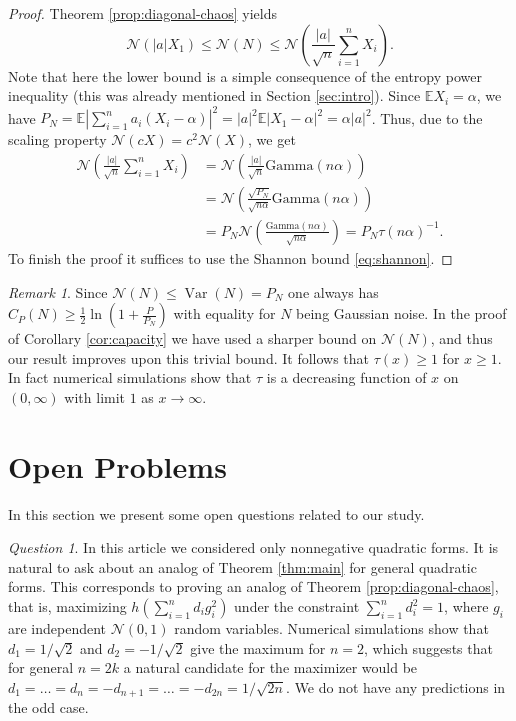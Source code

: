 \documentclass[11pt]{amsart}
\newcommand{\mc}[1]{\mathcal{{#1}}}
\newcommand{\1}{\mathbf{1}}
\newcommand{\E}{\mathbb{E}}
\DeclareMathOperator{\var}{Var}
\theoremstyle{definition}
\theoremstyle{definition}
\theoremstyle{remark}
\newtheorem{rem}{Remark}
\newtheorem{question}{Question}
\begin{document}
\begin{proof}
Theorem \ref{prop:diagonal-chaos} yields
\[
\mc{N}\left(|a| X_1 \right) \leq \mc{N}(N) \leq \mc{N}\left(\frac{|a|}{\sqrt{n}} \sum_{i=1}^n X_i \right).
\]
Note that here the lower bound is a simple consequence of the entropy power inequality (this was already mentioned in Section \ref{sec:intro}). Since $\E X_i=\alpha$, we have $P_N = \E|\sum_{i=1}^n a_i(X_i-\alpha)|^2=|a|^2 \E|X_1-\alpha|^2=\alpha |a|^2$. Thus, due to the scaling property $\mc{N}(cX)=c^2 \mc{N}(X)$, we get
\begin{align*}
	\mc{N}\left(\frac{|a|}{\sqrt{n}} \sum_{i=1}^n X_i \right) & = \mc{N}\left(\frac{|a|}{\sqrt{n}} \textrm{Gamma}(n\alpha)  \right) \\
	& = \mc{N}\left(\frac{\sqrt{P_N}}{\sqrt{n \alpha}} \textrm{Gamma}(n\alpha)  \right) \\ & = P_N \mc{N}\left(\frac{\textrm{Gamma}(n\alpha)}{\sqrt{n \alpha}}   \right) = P_N  \tau(n \alpha)^{-1}.
\end{align*}
To finish the proof it suffices to use the Shannon bound \eqref{eq:shannon}. 
\end{proof}

\begin{rem}
Since $\mc{N}(N) \leq \var(N)=P_N$ one always has $C_P(N) \geq \frac12 \ln(1+\frac{P}{P_N})$ with equality for $N$ being Gaussian noise. In the proof of Corollary \ref{cor:capacity} we have used a sharper bound on $\mc{N}(N)$, and thus our result improves upon this trivial bound. It follows that $\tau(x) \geq 1$ for $x \geq 1$. In fact numerical simulations show that $\tau$ is a decreasing function of $x$ on $(0,\infty)$ with limit $1$ as $x \to \infty$. 
\end{rem}


\section{Open Problems}\label{sec:op}

In this section we present some open questions related to our study.

\begin{question}\label{que:1}
In this article we considered only nonnegative quadratic forms. It is natural to ask about an analog of Theorem \ref{thm:main} for general quadratic forms. This corresponds to proving an analog of Theorem \ref{prop:diagonal-chaos}, that is, maximizing $h\left(\sum_{i=1}^n d_i g_i^2\right)$ under the constraint $\sum_{i=1}^n d_i^2=1$, where $g_i$ are independent $\mc{N}(0,1)$ random variables. Numerical simulations show that $d_1=1/\sqrt{2}$ and $d_2=-1/\sqrt{2}$ give the maximum for $n=2$, which suggests that for general $n=2k$ a natural candidate for the maximizer would be $d_1=\ldots=d_n = -d_{n+1} = \ldots = -d_{2n}= 1/\sqrt{2n}$. We do not have any predictions in the odd case.
\end{question} 
\end{document}
